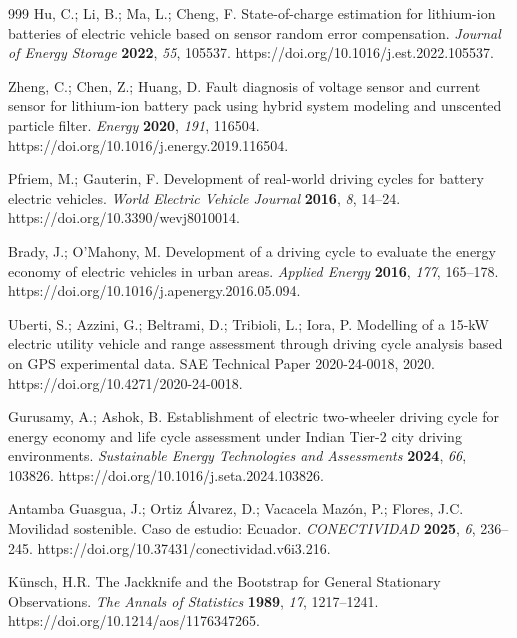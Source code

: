 \documentclass[vehicles,article,submit,moreauthors]{Definitions/mdpi}
\begin{document}
\begin{thebibliography}{999}
    Hu, C.; Li, B.; Ma, L.; Cheng, F. State-of-charge estimation for lithium-ion batteries of electric vehicle based on sensor random error compensation. \textit{Journal of Energy Storage} \textbf{2022}, \textit{55}, 105537. https://doi.org/10.1016/j.est.2022.105537.

    Zheng, C.; Chen, Z.; Huang, D. Fault diagnosis of voltage sensor and current sensor for lithium-ion battery pack using hybrid system modeling and unscented particle filter. \textit{Energy} \textbf{2020}, \textit{191}, 116504. https://doi.org/10.1016/j.energy.2019.116504.

    Pfriem, M.; Gauterin, F. Development of real-world driving cycles for battery electric vehicles. \textit{World Electric Vehicle Journal} \textbf{2016}, \textit{8}, 14--24. https://doi.org/10.3390/wevj8010014.

    Brady, J.; O'Mahony, M. Development of a driving cycle to evaluate the energy economy of electric vehicles in urban areas. \textit{Applied Energy} \textbf{2016}, \textit{177}, 165--178. https://doi.org/10.1016/j.apenergy.2016.05.094.

    Uberti, S.; Azzini, G.; Beltrami, D.; Tribioli, L.; Iora, P. Modelling of a 15-kW electric utility vehicle and range assessment through driving cycle analysis based on GPS experimental data. SAE Technical Paper 2020-24-0018, 2020. https://doi.org/10.4271/2020-24-0018.

    Gurusamy, A.; Ashok, B. Establishment of electric two-wheeler driving cycle for energy economy and life cycle assessment under Indian Tier-2 city driving environments. \textit{Sustainable Energy Technologies and Assessments} \textbf{2024}, \textit{66}, 103826. https://doi.org/10.1016/j.seta.2024.103826.

    Antamba Guasgua, J.; Ortiz Álvarez, D.; Vacacela Mazón, P.; Flores, J.C. Movilidad sostenible. Caso de estudio: Ecuador. \textit{CONECTIVIDAD} \textbf{2025}, \textit{6}, 236--245. https://doi.org/10.37431/conectividad.v6i3.216.

    Künsch, H.R. The Jackknife and the Bootstrap for General Stationary Observations. \textit{The Annals of Statistics} \textbf{1989}, \textit{17}, 1217--1241. https://doi.org/10.1214/aos/1176347265.


\end{thebibliography}
\end{document}
